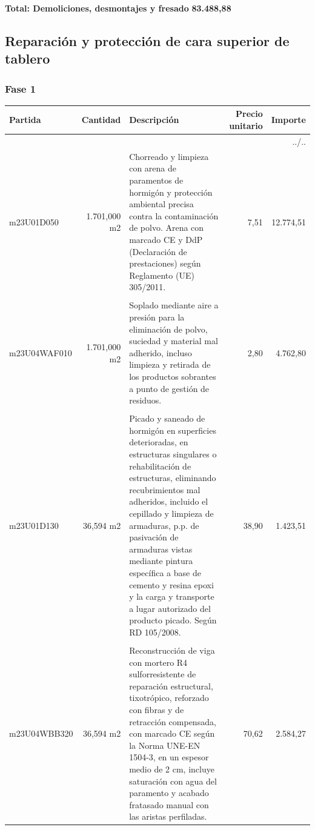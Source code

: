 \documentclass{book}%
\begin{document}
%
\noindent%
\large%
\textbf{Total: Demoliciones, desmontajes y fresado }%
\dotfill%
\textbf{83.488,88}%
\newline%
\normalsize

%
\subsection{Reparación y protección de cara superior de tablero}%
\subsubsection{Fase 1}%
\small%
\begin{longtable}{lrlrr}%
Partida&Cantidad&Descripción&\multicolumn{1}{p{1.5cm}}{Precio unitario}&Importe\\%
\hline%
\endhead%
\multicolumn{5}{r}{../..}\\%
\endfoot%
\hline%
\endlastfoot%
m23U01D050& 1.701,000 m2&\multicolumn{1}{p{5cm}}{Chorreado y limpieza con arena de paramentos de hormigón y protección ambiental precisa contra la contaminación de polvo. Arena con marcado CE y DdP (Declaración de prestaciones) según Reglamento (UE) 305/2011.}&      7,51&12.774,51\\%
&&&&\\%
m23U04WAF010& 1.701,000 m2&\multicolumn{1}{p{5cm}}{Soplado mediante aire a presión para la eliminación de polvo, suciedad y material mal adherido, incluso limpieza y retirada de los productos sobrantes a punto de gestión de residuos.}&      2,80&4.762,80\\%
&&&&\\%
m23U01D130&    36,594 m2&\multicolumn{1}{p{5cm}}{Picado y saneado de hormigón en superficies deterioradas, en estructuras singulares o rehabilitación de estructuras, eliminando recubrimientos mal adheridos, incluido el cepillado y limpieza de armaduras, p.p. de pasivación de armaduras vistas mediante pintura específica a base de cemento y resina epoxi y la carga y transporte a lugar autorizado del producto picado. Según RD 105/2008.}&     38,90&1.423,51\\%
&&&&\\%
m23U04WBB320&    36,594 m2&\multicolumn{1}{p{5cm}}{Reconstrucción de viga con mortero R4 sulforresistente de reparación estructural, tixotrópico, reforzado con fibras y de retracción compensada, con marcado CE según la Norma UNE{-}EN 1504{-}3, en un espesor medio de 2 cm, incluye saturación con agua del paramento y acabado fratasado manual con las aristas perfiladas.}&     70,62&2.584,27\\%

\end{longtable}
\end{document}
